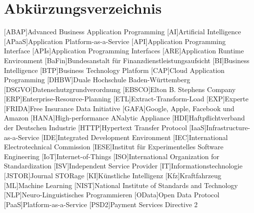 \clearpage
\chapter*{Abkürzungsverzeichnis}	


\begin{acronym}[XXXXXXX]
	[ABAP]{Advanced Business Application Programming}
	[AI]{Artificial Intelligence}
	[APaaS]{Application Platform-as-a-Service}
	[API]{Application Programming Interface}
	[APIs]{Application Programming Interfaces}	
	[ARE]{Application Runtime Environment}
	[BaFin]{Bundesanstalt für Finanzdienstleistungsaufsicht}
	[BI]{Business Intelligence}
	[BTP]{Business Technology Platform}
	[CAP]{Cloud Application Programming}
	[DHBW]{Duale Hochschule Baden-Württemberg}
	[DSGVO]{Datenschutzgrundverordnung}
	[EBSCO]{Elton B. Stephens Company}
	[ERP]{Enterprise-Resource-Planning}
	[ETL]{Extract-Transform-Load}
	[EXP]{Experte}
	[FRIDA]{Free Insurance Data Initiative}
	[GAFA]{Google, Apple, Facebook und Amazon}
	[HANA]{High-performance ANalytic Appliance}
	[HDI]{Haftpflichtverband der Deutschen Industrie}
	[HTTP]{Hypertext Transfer Protocol}
	[IaaS]{Infrastructure-as-a-Service}
	[IDE]{Integrated Development Environment}
	[IEC]{International Electrotechnical Commission}
	[IESE]{Institut für Experimentelles Software Engineering}
	[IoT]{Internet-of-Things}
	[ISO]{International Organization for Standardization}
	[ISV]{Independent Service Provider}
	[IT]{Informationstechnologie}
	[JSTOR]{Journal STORage}
	[KI]{Künstliche Intelligenz}
	[Kfz]{Kraftfahrzeug}
	[ML]{Machine Learning}
	[NIST]{National Institute of Standards and Technology}
	[NLP]{Neuro-Linguistisches Programmieren}
	[OData]{Open Data Protocol}
	[PaaS]{Platform-as-a-Service}
	[PSD2]{Payment Services Directive 2}

\end{acronym}
